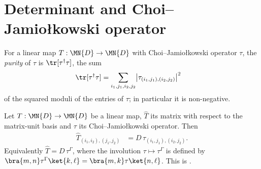 \section{Determinant and Choi--Jamio\l{}kowski operator}
\label{sec:channel_determinant_choi_bound}


\begin{definition}
    \label{def:choi_purity}
    \leanok
    For a linear map $T : \MN{D} \to \MN{D}$ with Choi--Jamio\l{}kowski
    operator $\tau$, the \emph{purity} of $\tau$ is $\tr[\tau^\dagger\tau]$,
    the sum
    \begin{align}
        \tr[\tau^\dagger\tau]
        &= \sum_{i_1,j_1,i_2,j_2}
            \bigl|\tau_{(i_1,j_1),(i_2,j_2)}\bigr|^2
        \label{eq:representations_purity_entries}
    \end{align}
    of the squared moduli of the entries of $\tau$; in particular it is
    non-negative.
\end{definition}

\begin{lemma}[Reshuffling]\label{lem:channel_matrix_eq_reshuffled_choi}
    \leanok
    Let $T : \MN{D} \to \MN{D}$ be a linear map, $\widehat{T}$ its matrix with
    respect to the matrix-unit basis and $\tau$ its Choi--Jamio\l{}kowski
    operator. Then
    \begin{align}
        \widehat{T}_{(i_1,i_2),(j_1,j_2)}
        &= D\,\tau_{(i_1,j_1),(i_2,j_2)}.
        \label{eq:representations_reshuffling}
    \end{align}
    Equivalently $\widehat{T}=D\,\tau^{\Gamma}$, where the involution
    $\tau\mapsto\tau^{\Gamma}$ is defined by
    $\bra{m,n}\tau^{\Gamma}\ket{k,\ell}=\bra{m,k}\tau\ket{n,\ell}$.
    This is \cite[Eq.~(2.22)]{Wolf2012Quantum}.
\end{lemma}

